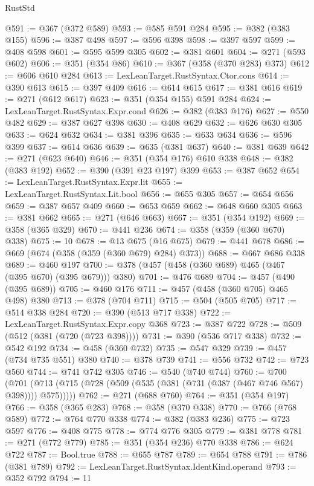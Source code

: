\begin{lexlean}{RustStd}
\begin{coremodule}
{\begin{coremodule}
{{{{{{{{{{{{{{@591 := @367 (@372 @589)
@593 := @585 @591 @284
@595 := @382 (@383 @155)
@596 := @387 @498
@597 := @596 @398
@598 := @397 @597
@599 := @408 @598
@601 := @595 @599 @305
@602 := @381 @601
@604 := @271 (@593 @602)
@606 := @351 (@354 @86)
@610 := @367 (@358 (@370 @283) @373)
@612 := @606 @610 @284
@613 := LexLeanTarget.RustSyntax.Ctor.cons
@614 := @390 @613
@615 := @397 @409
@616 := @614 @615
@617 := @381 @616
@619 := @271 (@612 @617)
@623 := @351 (@354 @155) @591 @284
@624 := LexLeanTarget.RustSyntax.Expr.cond
@626 := @382 (@383 @176)
@627 := @550 @482
@629 := @387 @627 @398
@630 := @408 @629
@632 := @626 @630 @305
@633 := @624 @632
@634 := @381 @396
@635 := @633 @634
@636 := @596 @399
@637 := @614 @636
@639 := @635 (@381 @637)
@640 := @381 @639
@642 := @271 (@623 @640)
@646 := @351 (@354 @176) @610 @338
@648 := @382 (@383 @192)
@652 := @390 (@391 @23 @197) @399
@653 := @387 @652
@654 := LexLeanTarget.RustSyntax.Expr.lit
@655 := LexLeanTarget.RustSyntax.Lit.bool
@656 := @655 @305
@657 := @654 @656
@659 := @387 @657 @409
@660 := @653 @659
@662 := @648 @660 @305
@663 := @381 @662
@665 := @271 (@646 @663)
@667 := @351 (@354 @192)
@669 := @358 (@365 @329)
@670 := @441 @236
@674 := @358 (@359 (@360 @670) @338)
@675 := 10
@678 := @13 @675 (@16 @675)
@679 := @441 @678
@686 := @669 (@674 (@358 (@359 (@360 @679) @284) @373))
@688 := @667 @686 @338
@689 := @460 @197
@700 := @378 (@457 (@458 (@360 @689) @465 (@467 (@395 @670) (@395 @679))) @380)
@701 := @476 @689
@704 := @457 (@490 (@395 @689))
@705 := @460 @176
@711 := @457 (@458 (@360 @705) @465 @498) @380
@713 := @378 (@704 @711)
@715 := @504 (@505 @705)
@717 := @514 @338 @284
@720 := @390 (@513 @717 @338)
@722 := LexLeanTarget.RustSyntax.Expr.copy @368
@723 := @387 @722
@728 := @509 (@512 (@381 (@720 (@723 @398))))
@731 := @390 (@536 @717 @338)
@732 := @542 @192
@734 := @458 (@360 @732)
@735 := @547 @329
@739 := @457 (@734 @735 @551) @380
@740 := @378 @739
@741 := @556 @732
@742 := @723 @560
@744 := @741 @742 @305
@746 := @540 (@740 @744)
@760 := @700
    (@701 (@713 (@715 (@728 (@509 (@535 (@381 (@731 (@387 (@467 @746 @567) @398)))) @575)))))
@762 := @271 (@688 @760)
@764 := @351 (@354 @197)
@766 := @358 (@365 @283)
@768 := @358 (@370 @338)
@770 := @766 (@768 @589)
@772 := @764 @770 @338
@774 := @382 (@383 @236)
@775 := @723 @597
@776 := @408 @775
@778 := @774 @776 @305
@779 := @381 @778
@781 := @271 (@772 @779)
@785 := @351 (@354 @236) @770 @338
@786 := @624 @722
@787 := Bool.true
@788 := @655 @787
@789 := @654 @788
@791 := @786 (@381 @789)
@792 := LexLeanTarget.RustSyntax.IdentKind.operand
@793 := @352 @792
@794 := 11
}}}}}}}}}}}}}}
\end{coremodule}}
\end{coremodule}
\end{lexlean}
